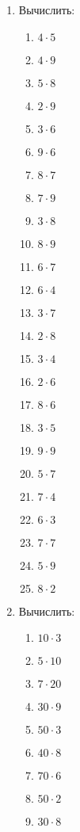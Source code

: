 \documentclass[12pt, a4paper]{article}
\begin{document}
	
 \cfoot{}
\begin{enumerate}
	\item Вычислить:
	\begin{multicols}{5}
		\begin{enumerate}
			\item $4\cdot5$
			\item $4\cdot9$
			\item $5\cdot8$
			\item $2\cdot9$
			\item $3\cdot6$
			\item $9\cdot6$
			\item $8\cdot7$
			\item $7\cdot9$
			\item $3\cdot8$
			\item $8\cdot9$
			\item $6\cdot7$
			\item $6\cdot4$
			\item $3\cdot7$
			\item $2\cdot8$
			\item $3\cdot4$
			\item $2\cdot6$
			\item $8\cdot6$
			\item $3\cdot5$
			\item $9\cdot9$
			\item $5\cdot7$
			\item $7\cdot4$
			\item $6\cdot3$
			\item $7\cdot7$
			\item $5\cdot9$
			\item $8\cdot2$
		\end{enumerate}
	\end{multicols}
	\item Вычислить:
	\begin{multicols}{5}
		\begin{enumerate}
			\item $10\cdot3$
			\item $5\cdot10$
			\item $7\cdot20$
			\item $30\cdot9$
			\item $50\cdot3$
			\item $40\cdot8$
			\item $70\cdot6$
			\item $50\cdot2$
			\item $30\cdot8$

\end{enumerate}
\end{multicols}
\end{enumerate}
\end{document}
